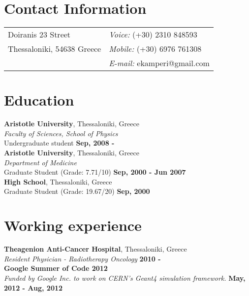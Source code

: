 \documentclass[margin,line]{res}
\begin{document}

\begin{resume}
\section{\sc Contact Information}
\vspace{.05in}
\begin{tabular}{@{}p{2in}p{4in}}
Doiranis 23 Street           & {\it Voice:}   (+30) 2310 848593 \\
Thessaloniki, 54638 Greece   & {\it Mobile:}  (+30) 6976 761308 \\
                             & {\it E-mail:}  ekamperi@gmail.com\\
\end{tabular}

\section{\sc Education}
{\bf Aristotle University}, Thessaloniki, Greece\\
{\em Faculty of Sciences, School of Physics}\\
Undergraduate student \hfill {\bf Sep, 2008 - }\\

{\bf Aristotle University}, Thessaloniki, Greece\\
{\em Department of Medicine}\\
Graduate Student (Grade: 7.71/10) \hfill {\bf Sep, 2000 - Jun 2007}\\

{\bf High School}, Thessaloniki, Greece\\
Graduate Student (Grade: 19.67/20) \hfill {\bf Sep, 2000}\\

\section{\sc Working experience}
{\bf Theagenion Anti-Cancer Hospital}, Thessaloniki, Greece\\
{\em Resident Physician - Radiotherapy Oncology}
\hfill {\bf 2010 - }\\

{\bf Google Summer of Code 2012}\\
{\em Funded by Google Inc. to work on CERN's Geant4 simulation framework.}
\hfill {\bf May, 2012 - Aug, 2012}\\


\end{resume}
\end{document}
